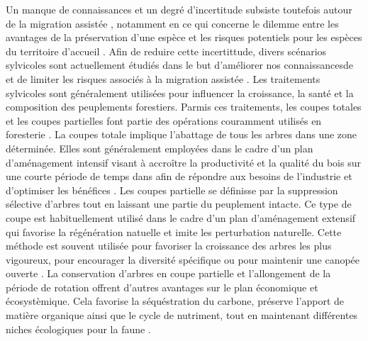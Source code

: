 Un manque de connaissances et un degré d'incertitude subsiste toutefois autour de la migration assistée \citep{Park2018Informationunderload,Klenk2015assistedmigration}, 
notamment en ce qui concerne le dilemme entre les avantages de la préservation d'une espèce et les risques potentiels pour les espèces du territoire d'accueil \citep{Hewitt2011Takingstock,McLachlan2007frameworkdebate,Vitt2010Assistedmigration}.
Afin de reduire cette incertittude, divers scénarios sylvicoles sont actuellement étudiés dans le but d'améliorer nos connaissancesde et de limiter les risques associés à la migration assistée \citep{royoDesiredREgenerationAssisted2023}.
Les traitements sylvicoles sont généralement utilisées pour influencer la croissance, la santé et la composition des peuplements forestiers.
Parmis ces traitements, les coupes totales et les coupes partielles font partie des opérations couramment utilisés en foresterie \citep{Ameray2021Forestcarbon,Chaudhary2016Impactforest,Man2008Elevenyearresponses,MontoroGirona2018ConiferRegeneration,PamerleauCouture2015Effectthree}. 
La coupes totale implique l'abattage de tous les arbres dans une zone déterminée.
Elles sont généralement employées dans le cadre d'un plan d'aménagement intensif visant à accroître la productivité et la qualité du bois 
sur une courte période de temps dans afin de répondre aux besoins de l'industrie et d'optimiser les bénéfices \citep{Ameray2021Forestcarbon}.
Les coupes partielle se définisse par la suppression sélective d'arbres tout en laissant une partie du peuplement intacte. 
Ce type de coupe est habituellement utilisé dans le cadre d'un plan d'aménagement extensif qui favorise la régénération natuelle et imite les perturbation naturelle.
Cette méthode est souvent utilisée pour favoriser la croissance des arbres les plus vigoureux, pour encourager la diversité spécifique ou pour maintenir une canopée ouverte \citep{Ameray2021Forestcarbon,Irland2011Timberproductivity}.
La conservation d'arbres  en coupe partielle et l'allongement de la période de rotation offrent d'autres avantages sur le plan économique et écosystèmique. 
Cela favorise la séquéstration du carbone, préserve l'apport de matière organique ainsi que le cycle de nutriment, 
tout en maintenant différentes niches écologiques pour la faune \citep{Ameray2021Forestcarbon,Barg1999Influencepartial,Tong2020Forestmanagement}.

